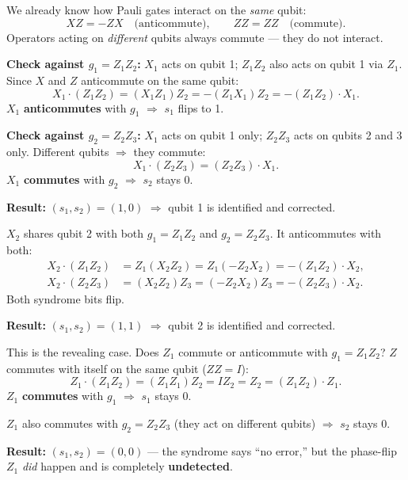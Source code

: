 \documentclass[11pt, a4paper]{article}
\theoremstyle{definition}
\theoremstyle{plain}
\theoremstyle{remark}
\begin{document}
We already know how Pauli gates interact on the \emph{same} qubit:
\[
  XZ = -ZX \quad \text{(anticommute)},
  \qquad
  ZZ = ZZ  \quad \text{(commute)}.
\]
Operators acting on \emph{different} qubits always commute --- they do
not interact.

\begin{workedexample}

\textbf{Check against $g_1 = Z_1Z_2$:}
$X_1$ acts on qubit 1; $Z_1Z_2$ also acts on qubit 1 via $Z_1$.
Since $X$ and $Z$ anticommute on the same qubit:
\[
  X_1\cdot(Z_1Z_2) = (X_1Z_1)Z_2 = -(Z_1X_1)Z_2 = -(Z_1Z_2)\cdot X_1.
\]
$X_1$ \textbf{anticommutes} with $g_1$ $\Rightarrow$ $s_1$ flips to 1.

\textbf{Check against $g_2 = Z_2Z_3$:}
$X_1$ acts on qubit 1 only; $Z_2Z_3$ acts on qubits 2 and 3 only.
Different qubits $\Rightarrow$ they commute:
\[
  X_1\cdot(Z_2Z_3) = (Z_2Z_3)\cdot X_1.
\]
$X_1$ \textbf{commutes} with $g_2$ $\Rightarrow$ $s_2$ stays 0.

\textbf{Result:} $(s_1, s_2) = (1, 0)$ $\Rightarrow$ qubit 1 is
identified and corrected. \checkmark
\end{workedexample}

\begin{workedexample}
$X_2$ shares qubit 2 with both $g_1 = Z_1Z_2$ and $g_2 = Z_2Z_3$.
It anticommutes with both:
\begin{align*}
  X_2\cdot(Z_1Z_2) &= Z_1(X_2Z_2) = Z_1(-Z_2X_2) = -(Z_1Z_2)\cdot X_2,\\
  X_2\cdot(Z_2Z_3) &= (X_2Z_2)Z_3 = (-Z_2X_2)Z_3 = -(Z_2Z_3)\cdot X_2.
\end{align*}
Both syndrome bits flip.

\textbf{Result:} $(s_1, s_2) = (1, 1)$ $\Rightarrow$ qubit 2 is
identified and corrected. \checkmark
\end{workedexample}

\begin{workedexample}
This is the revealing case.
Does $Z_1$ commute or anticommute with $g_1 = Z_1Z_2$?
$Z$ commutes with itself on the same qubit ($ZZ = I$):
\[
  Z_1\cdot(Z_1Z_2) = (Z_1Z_1)Z_2 = IZ_2 = Z_2 = (Z_1Z_2)\cdot Z_1.
\]
$Z_1$ \textbf{commutes} with $g_1$ $\Rightarrow$ $s_1$ stays 0.

$Z_1$ also commutes with $g_2 = Z_2Z_3$ (they act on different qubits)
$\Rightarrow$ $s_2$ stays 0.

\textbf{Result:} $(s_1, s_2) = (0, 0)$ --- the syndrome says
``no error,'' but the phase-flip $Z_1$ \emph{did} happen and is
completely \textbf{undetected}.
\end{workedexample}
\end{document}
